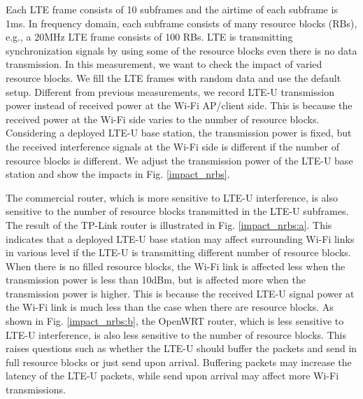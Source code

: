 Each LTE frame consists of 10 subframes and the airtime of
each subframe is 1ms. 
In frequency domain, each subframe consists of many resource
blocks (RBs), e.g., a 20MHz LTE frame consists of 100 RBs.
LTE is transmitting synchronization signals by using some of 
the resource blocks even there is no data transmission. 
In this measurement, we want to check the impact of 
varied resource blocks. 
We fill the LTE frames with random data and use
the default setup. 
Different from previous measurements, 
we record LTE-U transmission power instead of received 
power at the Wi-Fi AP/client side. 
This is because the received power at the Wi-Fi side
varies to the number of resource blocks. 
Considering a deployed LTE-U base station, the transmission 
power is fixed, but the received interference signals
at the Wi-Fi side is different if the number of
resource blocks is different. 
We adjust the transmission power of the LTE-U base
station and show the impacts in Fig. \ref{impact_nrbs}.

The commercial router, which is more sensitive to 
LTE-U interference, 
is also sensitive to the number of resource blocks
transmitted in the LTE-U subframes.
The result of the TP-Link router is illustrated
in Fig. \ref{impact_nrbs:a}.
This indicates that a deployed LTE-U base station
may affect surrounding Wi-Fi links 
in various level if the LTE-U is transmitting
different number of resource blocks. 
When there is no filled resource blocks,
the Wi-Fi link is affected less when 
the transmission power is less than 
10dBm, 
but is affected more when the transmission
power is higher. 
This is because the received LTE-U signal power at the Wi-Fi
link is much less than the case when there
are resource blocks. 
As shown in Fig. \ref{impact_nrbs:b},
the OpenWRT router, which is less sensitive to
LTE-U interference, 
is also less sensitive to the number of 
resource blocks. 
This raises questions such as whether the 
LTE-U should buffer the packets and 
send in full resource blocks or just
send upon arrival. 
Buffering packets may increase the latency
of the LTE-U packets, while
send upon arrival may affect more 
Wi-Fi transmissions. 


